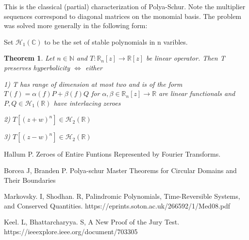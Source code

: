 \documentclass[10pt]{article}
\newcommand{\1}{\textbf{1}}
\newcommand{\R}{\mathbb{R}}
\newcommand{\C}{\mathbb{C}}
\newcommand{\N}{\mathbb{N}}
\newtheorem{theorem}{Theorem}
\theoremstyle{remark}
\theoremstyle{definition}
\theoremstyle{prop}
\theoremstyle{Corollary}
\begin{document}
This is the classical (partial) characterization of Polya-Schur. Note the multiplier sequences correspond to diagonal matrices on the monomial basis. The problem was solved more generally in the following form:

Set $\mathcal{H}_1(\C)$ to be the set of stable polynomials in n varibles. 

\begin{theorem}
	Let $n \in \N$ and $T : \R_n[z] \to \R[z]$ be linear operator. Then T preserves hyperbolicity $\iff$ either

	1) T has range of dimension at most two and is of the form $T(f) = \alpha(f) P + \beta(f) Q$ for $\alpha,\beta \in \R_n[z] \to \R$ are linear functionals and $P,Q \in \mathcal{H}_1(\R)$ have interlacing zeroes

	2) $T[(z+w)^n] \in \mathcal{H}_2(\R)$ 

	3) $T[(z-w)^n] \in \mathcal{H}_2(\R)$
\end{theorem}

\begin{thebibliography}{9}

 Hallum P. Zeroes of Entire Funtions Represented by Fourier Transforms. 

 Borcea J, Branden P. Polya-schur Master Theorems for Circular Domains and Their Boundaries


 Markovsky. I, Shodhan. R,
Palindromic Polynomials, Time-Reversible Systems, and Conserved Quantities. https://eprints.soton.ac.uk/266592/1/Med08.pdf

 Keel. L, Bhattarcharyya. S,
A New Proof of the Jury Test. https://ieeexplore.ieee.org/document/703305



\end{thebibliography}
\end{document}
